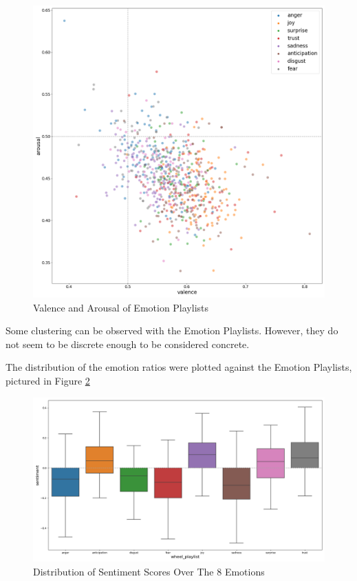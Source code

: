\documentclass[11pt]{article}
\begin{document}
\begin{figure}[!ht]
  \includegraphics[scale=0.35]{../statics/plots/va_wheel_playlist_False.png}
  \centering
  \caption{Valence and Arousal of Emotion Playlists}
  \label{fig:va_wheel}
\end{figure}

Some clustering can be observed with the Emotion Playlists. However, they do not seem to be discrete enough to be considered concrete.

The distribution of the emotion ratios were plotted against the Emotion Playlists, pictured in Figure \ref{fig:wheel_playlist}

\begin{figure}[!ht]
  \includegraphics[scale=0.42]{../statics/plots/wheel_playlist.png}
  \centering
  \caption{Distribution of Sentiment Scores Over The 8 Emotions}
  \label{fig:wheel_playlist}
\end{figure}
\end{document}
